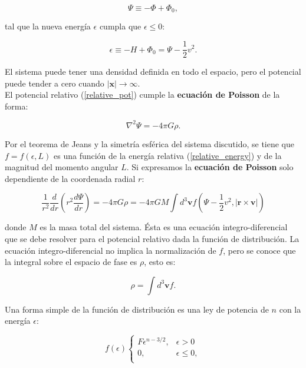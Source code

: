 \begin{equation}
\label{relative_pot}
\Psi \equiv -\Phi + \Phi_0,
\end{equation}

tal que la nueva energía $\epsilon$ cumpla que $\epsilon \leq 0$:

\begin{equation}
\label{relative_energy}
\epsilon \equiv -H + \Phi_0 = \Psi - \frac{1}{2} v^2.
\end{equation}

El sistema puede tener una densidad definida en todo el espacio, pero el potencial puede tender a cero cuando $|\bm{x}| \rightarrow \infty$.\\

El potencial relativo (\ref{relative_pot}) cumple la \textbf{ecuación de Poisson} de la forma:

\begin{equation}
\label{new_Poisson_eq}
\nabla^2 \Psi = -4\pi G \rho.
\end{equation}

Por el teorema de Jeans y la simetría esférica del sistema discutido, se tiene que $f = f(\epsilon, L)$ es una función de la energía relativa (\ref{relative_energy}) y de la magnitud del momento angular $L$. Si expresamos la \textbf{ecuación de Poisson} solo dependiente de la coordenada radial $r$:

\begin{equation}
\label{integro_diff_psi_f}
\frac{1}{r^2} \frac{d}{dr} \left( r^2 \frac{d\Psi}{dr} \right) = -4\pi G\rho = -4\pi G M \int d^3\bm{v} f \left( \Psi - \frac{1}{2} v^2, | \bm{r}\times \bm{v} | \right)
\end{equation}

donde $M$ es la masa total del sistema. Ésta es una ecuación integro-diferencial que se debe resolver para el potencial relativo dada la función de distribución. La ecuación integro-diferencial no implica la normalización de $f$, pero se conoce que la integral sobre el espacio de fase es $\rho$, esto es:

$$ \rho = \int d^3 \bm{v} f. $$

Una forma simple de la función de distribución es una ley de potencia de $n$ con la energía $\epsilon$:

\[ 
f(\epsilon)\left\{
\begin{array}{ll}
      F\epsilon^{n-3/2}, & \epsilon > 0 \\
      0, & \epsilon \leq 0, \\
\end{array} 
\right. \]

